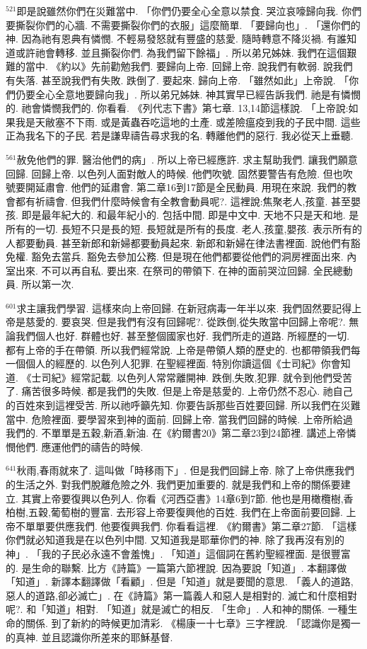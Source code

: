 \documentclass{book}
\begin{document}
$^{521}$即是說雖然你們在災難當中.
「你們仍要全心全意以禁食.
哭泣哀嚎歸向我.
你們要撕裂你們的心牆.
不需要撕裂你們的衣服」這麼簡單.
「要歸向也」.
「還你們的神.
因為祂有恩典有憐憫.
不輕易發怒就有豐盛的慈愛.
隨時轉意不降災禍.
有誰知道或許祂會轉移.
並且撕裂你們.
為我們留下餘福」.
所以弟兄姊妹.
我們在這個艱難的當中.
《約以》先前勸勉我們.
要歸向上帝.
回歸上帝.
說我們有軟弱.
說我們有失落.
甚至說我們有失敗.
跌倒了.
要起來.
歸向上帝.
「雖然如此」上帝說.
「你們仍要全心全意地要歸向我」.
所以弟兄姊妹.
神其實早已經告訴我們.
祂是有憐憫的.
祂會憐憫我們的.
你看看.
《列代志下書》第七章.
13,14節這樣說.
「上帝說:如果我是天敝塞不下雨.
或是黃蟲吞吃這地的土產.
或差險瘟疫到我的子民中間.
這些正為我名下的子民.
若是謙卑禱告尋求我的名.
轉離他們的惡行.
我必從天上垂聽.

$^{561}$赦免他們的罪.
醫治他們的病」.
所以上帝已經應許.
求主幫助我們.
讓我們願意回歸.
回歸上帝.
以色列人面對敵人的時候.
他們吹號.
固然要警告有危險.
但也吹號要開延肅會.
他們的延肅會.
第二章16到17節是全民動員.
用現在來說.
我們的教會都有祈禱會.
但我們什麼時候會有全教會動員呢?.
這裡說:焦聚老人,孩童.
甚至嬰孩.
即是最年紀大的.
和最年紀小的.
包括中間.
即是中文中.
天地不只是天和地.
是所有的一切.
長短不只是長的短.
長短就是所有的長度.
老人,孩童,嬰孩.
表示所有的人都要動員.
甚至新郎和新婦都要動員起來.
新郎和新婦在律法書裡面.
說他們有豁免權.
豁免去當兵.
豁免去參加公務.
但是現在他們都要從他們的洞房裡面出來.
內室出來.
不可以再自私.
要出來.
在祭司的帶領下.
在神的面前哭泣回歸.
全民總動員.
所以第一次.

$^{601}$求主讓我們學習.
這樣來向上帝回歸.
在新冠病毒一年半以來.
我們固然要記得上帝是慈愛的.
要哀哭.
但是我們有沒有回歸呢?.
從跌倒,從失敗當中回歸上帝呢?.
無論我們個人也好.
群體也好.
甚至整個國家也好.
我們所走的道路.
所經歷的一切.
都有上帝的手在帶領.
所以我們經常說.
上帝是帶領人類的歷史的.
也都帶領我們每一個個人的經歷的.
以色列人犯罪.
在聖經裡面.
特別你讀這個《士司紀》你會知道.
《士司紀》經常記載.
以色列人常常離開神.
跌倒,失敗,犯罪.
就令到他們受苦了.
痛苦很多時候.
都是我們的失敗.
但是上帝是慈愛的.
上帝仍然不忍心.
祂自己的百姓來到這裡受苦.
所以祂呼籲先知.
你要告訴那些百姓要回歸.
所以我們在災難當中.
危險裡面.
要學習來到神的面前.
回歸上帝.
當我們回歸的時候.
上帝所給過我們的.
不單單是五穀,新酒,新油.
在《約爾書20》第二章23到24節裡.
講述上帝憐憫他們.
應運他們的禱告的時候.

$^{641}$秋雨,春雨就來了.
這叫做「時移雨下」.
但是我們回歸上帝.
除了上帝供應我們的生活之外.
對我們脫離危險之外.
我們更加重要的.
就是我們和上帝的關係要建立.
其實上帝要復興以色列人.
你看《河西亞書》14章6到7節.
他也是用橄欖樹,香柏樹,五穀,葡萄樹的豐富.
去形容上帝要復興他的百姓.
我們在上帝面前要回歸.
上帝不單單要供應我們.
他要復興我們.
你看看這裡.
《約爾書》第二章27節.
「這樣你們就必知道我是在以色列中間.
又知道我是耶華你們的神.
除了我再沒有別的神」.
「我的子民必永遠不會羞愧」.
「知道」這個詞在舊約聖經裡面.
是很豐富的.
是生命的聯繫.
比方《詩篇》一篇第六節裡說.
因為要說「知道」.
本翻譯做「知道」.
新譯本翻譯做「看顧」.
但是「知道」就是要聞的意思.
「義人的道路,惡人的道路,卻必滅亡」.
在《詩篇》第一篇義人和惡人是相對的.
滅亡和什麼相對呢?.
和「知道」相對.
「知道」就是滅亡的相反.
「生命」.
人和神的關係.
一種生命的關係.
到了新約的時候更加清彩.
《楊康一十七章》三字裡說.
「認識你是獨一的真神.
並且認識你所差來的耶穌基督.
\end{document}
